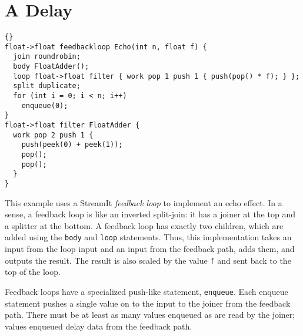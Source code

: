\section{A Delay}

\begin{lstlisting}{}
float->float feedbackloop Echo(int n, float f) {
  join roundrobin;
  body FloatAdder();
  loop float->float filter { work pop 1 push 1 { push(pop() * f); } };
  split duplicate;
  for (int i = 0; i < n; i++)
    enqueue(0);
}
float->float filter FloatAdder {
  work pop 2 push 1 {
    push(peek(0) + peek(1));
    pop();
    pop();
  }
}
\end{lstlisting}

This example uses a StreamIt \emph{feedback loop} to implement an echo
effect.  In a sense, a feedback loop is like an inverted split-join:
it has a joiner at the top and a splitter at the bottom.  A feedback
loop has exactly two children, which are added using the \lstinline|body|
and \lstinline|loop| statements.  Thus, this implementation takes an
input from the loop input and an input from the feedback path, adds
them, and outputs the result.  The result is also scaled by the value
\lstinline|f| and sent back to the top of the loop.

Feedback loops have a specialized push-like statement,
\lstinline|enqueue|.  Each enqueue statement pushes a single value on
to the input to the joiner from the feedback path.  There must be at
least as many values enqueued as are read by the joiner; values
enqueued delay data from the feedback path.
